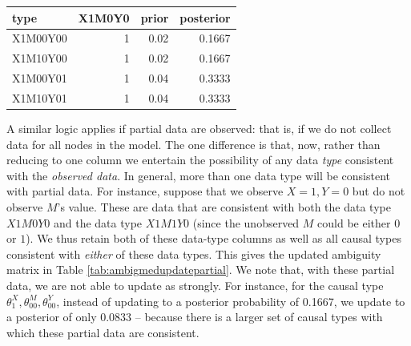 \documentclass[12pt,]{book}
\begin{document}
\begin{tabular}{l|r|r|r}
\hline
type & X1M0Y0 & prior & posterior\\
\hline
X1M00Y00 & 1 & 0.02 & 0.1667\\
\hline
X1M10Y00 & 1 & 0.02 & 0.1667\\
\hline
X1M00Y01 & 1 & 0.04 & 0.3333\\
\hline
X1M10Y01 & 1 & 0.04 & 0.3333\\
\hline
\end{tabular}

A similar logic applies if partial data are observed: that is, if we do not collect data for all nodes in the model. The one difference is that, now, rather than reducing to one column we entertain the possibility of any data \emph{type} consistent with the \emph{observed data}. In general, more than one data type will be consistent with partial data. For instance, suppose that we observe \(X=1, Y=0\) but do not observe \(M\)'s value. These are data that are consistent with both the data type \(X1M0Y0\) and the data type \(X1M1Y0\) (since the unobserved \(M\) could be either \(0\) or \(1\)). We thus retain both of these data-type columns as well as all causal types consistent with \emph{either} of these data types. This gives the updated ambiguity matrix in Table \ref{tab:ambigmedupdatepartial}. We note that, with these partial data, we are not able to update as strongly. For instance, for the causal type \(\theta^X_1,\theta^M_{00},\theta^Y_{00}\), instead of updating to a posterior probability of 0.1667, we update to a posterior of only 0.0833 -- because there is a larger set of causal types with which these partial data are consistent.
\end{document}
